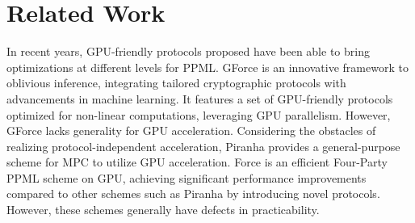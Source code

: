 \section{Related Work}
In recent years, GPU-friendly protocols proposed have been able to bring optimizations at different levels for PPML.
GForce \citep{Ng2021GForce} is an innovative framework to oblivious inference, integrating tailored cryptographic protocols with advancements in machine learning. It features a set of GPU-friendly protocols optimized for non-linear computations, leveraging GPU parallelism. However, GForce lacks generality for GPU acceleration. 
Considering the obstacles of realizing protocol-independent acceleration, Piranha \citep{Watson2022Piranha} provides a general-purpose scheme for MPC to utilize GPU acceleration.
Force \citep{Dai2023Force} is an efficient Four-Party PPML scheme on GPU, achieving significant performance improvements compared to other schemes such as Piranha by introducing novel protocols.
However, these schemes generally have defects in practicability.